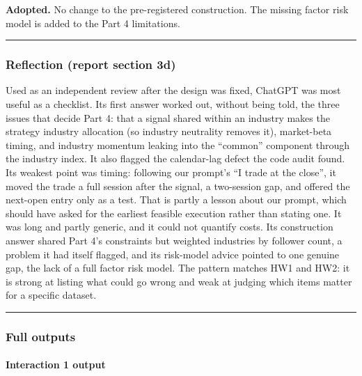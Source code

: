 \textbf{Adopted.} No change to the pre-registered construction. The missing factor risk model
is added to the Part 4 limitations.

\begin{center}\rule{0.5\linewidth}{0.5pt}\end{center}

\hypertarget{reflection-report-section-3d}{%
\subsubsection{Reflection (report section 3d)}\label{reflection-report-section-3d}}

Used as an independent review after the design was fixed, ChatGPT was most useful as a
checklist. Its first answer worked out, without being told, the three issues that decide
Part 4: that a signal shared within an industry makes the strategy industry allocation (so
industry neutrality removes it), market-beta timing, and industry momentum leaking into
the ``common'' component through the industry index. It also flagged the calendar-lag defect
the code audit found. Its weakest point was timing: following our prompt's ``I trade at the
close'', it moved the trade a full session after the signal, a two-session gap,
and offered the next-open entry only as a test. That is partly a
lesson about our prompt, which should have asked for the earliest feasible execution rather
than stating one. It was long and partly generic, and it could not quantify costs. Its construction
answer shared Part 4's constraints but weighted industries by follower count, a problem it
had itself flagged, and its risk-model advice pointed to one genuine gap, the lack of a
full factor risk model. The pattern matches
HW1 and HW2: it is strong at listing what could go wrong and weak at judging which items
matter for a specific dataset.

\begin{center}\rule{0.5\linewidth}{0.5pt}\end{center}

\hypertarget{full-outputs}{%
\subsubsection{Full outputs}\label{full-outputs}}

\hypertarget{interaction-1-output}{%
\paragraph{Interaction 1 output}\label{interaction-1-output}}

